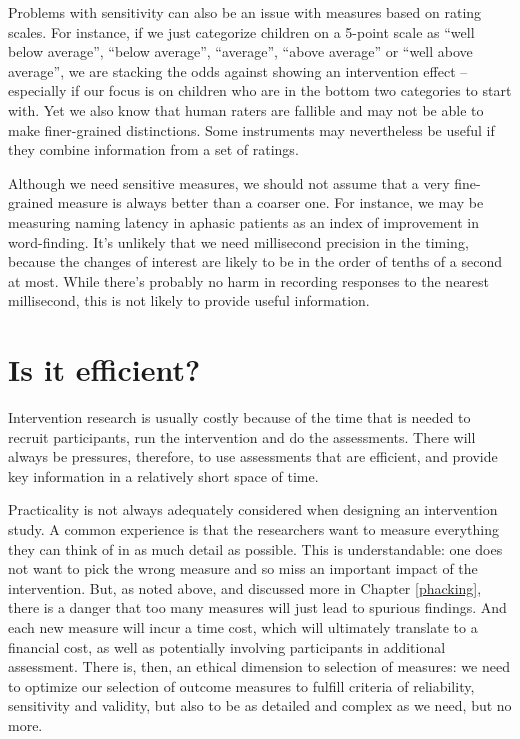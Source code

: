 \documentclass{krantz}
\begin{document}
Problems with sensitivity can also be an issue with measures based on rating scales. For instance, if we just categorize children on a 5-point scale as ``well below average'', ``below average'', ``average'', ``above average'' or ``well above average'', we are stacking the odds against showing an intervention effect -- especially if our focus is on children who are in the bottom two categories to start with. Yet we also know that human raters are fallible and may not be able to make finer-grained distinctions. Some instruments may nevertheless be useful if they combine information from a set of ratings.

Although we need sensitive measures, we should not assume that a very fine-grained measure is always better than a coarser one. For instance, we may be measuring naming latency in aphasic patients as an index of improvement in word-finding. It's unlikely that we need millisecond precision in the timing, because the changes of interest are likely to be in the order of tenths of a second at most. While there's probably no harm in recording responses to the nearest millisecond, this is not likely to provide useful information.

\hypertarget{is-it-efficient}{%
\section{Is it efficient?}\label{is-it-efficient}}

Intervention research is usually costly because of the time that is needed to recruit participants, run the intervention and do the assessments. There will always be pressures, therefore, to use assessments that are efficient, and provide key information in a relatively short space of time.

Practicality is not always adequately considered when designing an intervention study. A common experience is that the researchers want to measure everything they can think of in as much detail as possible. This is understandable: one does not want to pick the wrong measure and so miss an important impact of the intervention. But, as noted above, and discussed more in Chapter \ref{phacking}, there is a danger that too many measures will just lead to spurious findings. And each new measure will incur a time cost, which will ultimately translate to a financial cost, as well as potentially involving participants in additional assessment. There is, then, an ethical dimension to selection of measures: we need to optimize our selection of outcome measures to fulfill criteria of reliability, sensitivity and validity, but also to be as detailed and complex as we need, but no more.
\end{document}
